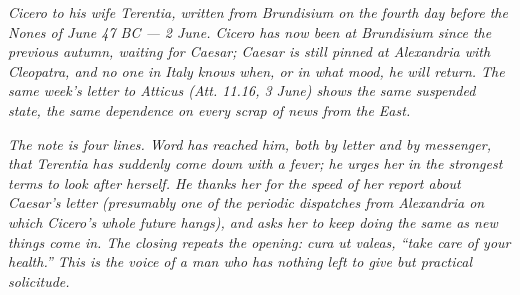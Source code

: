
\textit{Cicero to his wife Terentia, written from
Brundisium on the fourth day before the Nones of June
47 BC --- 2 June. Cicero has now been at Brundisium
since the previous autumn, waiting for Caesar; Caesar
is still pinned at Alexandria with Cleopatra, and no
one in Italy knows when, or in what mood, he will
return. The same week's letter to Atticus
(\textit{Att.} 11.16, 3 June) shows the same suspended
state, the same dependence on every scrap of news
from the East.}

\textit{The note is four lines. Word has reached him,
both by letter and by messenger, that Terentia has
suddenly come down with a fever; he urges her in the
strongest terms to look after herself. He thanks her
for the speed of her report about Caesar's letter
(presumably one of the periodic dispatches from
Alexandria on which Cicero's whole future hangs), and
asks her to keep doing the same as new things come in.
The closing repeats the opening: \textit{cura ut
valeas}, ``take care of your health.'' This is the
voice of a man who has nothing left to give but
practical solicitude.}
